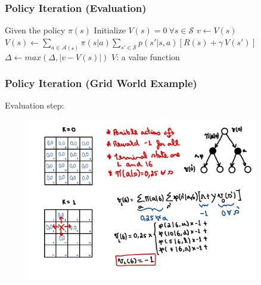 \begin{frame}
    \frametitle{Policy Iteration (Evaluation)}
        \begin{algorithmic}[]
            \STATE Given the policy $\pi(s)$
            \STATE Initialize $V(s) = 0~\forall s\in\mathcal{S}$
            \break
                    $v \leftarrow V(s)$
                    $V(s) \leftarrow\sum_{a\in\mathcal{A(s)}}\pi(s|a)\sum_{s'\in\mathcal{S}}p(s'|s,a)[R(s)+\gamma~V(s')]$
                    $\Delta\leftarrow max(\Delta, |v-V(s)|)$
                \ENDFOR{}
            \ENDWHILE{}      
            \break
            \RETURN $V$: a value function

        \end{algorithmic}

\end{frame} 



\begin{frame}
    \frametitle{Policy Iteration (Grid World Example)}
    Evaluation step:
    \begin{figure}
        \centering
        \includegraphics[width=0.9\textwidth]{sections/optimization/figures/grid_world_pi_1.pdf}
    \end{figure}
\end{frame}

